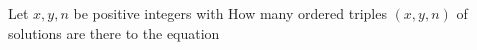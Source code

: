 Let $x,y,n$ be positive integers with  How many ordered triples $(x, y, n)$ of solutions are there to the equation 